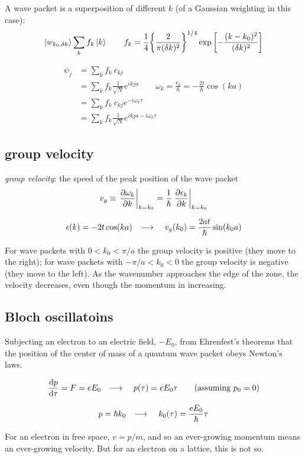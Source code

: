 \documentclass[10pt, a4paper, twocolumn]{article}
\newcommand{\deff}[1]{\par \noindent \textit{#1}: }
\newcommand{\arr}{\ensuremath{\longrightarrow\ }}
\begin{document}
A wave packet is a superposition of different $k$ (of a Gaussian weighting in this case):
\[ \ket{w_{k_0,\delta k}} \sum _k f_k \ket k
\qquad
f_k = \frac14
\qty{\frac{2}{\pi(\delta k)^2}}^{1/4}
\exp \left[ -\frac{(k-k_0)^2}{(\delta k)^2} \right] \]

\begin{equation*}
\begin{aligned}
\psi _j&= \sum _k f_k\ c_{kj}
\\&= \sum_k f_k \frac{1}{\sqrt N} e^{ikja}
\qquad \omega _k = \frac{\epsilon _k}{\hbar}
=-\frac{2t}{\hbar} \cos (ka)
\\&= \sum _k f_k \ c_{kj} e^{-i\omega _k \tau}
\\&= \sum _k f_k \frac{1}{\sqrt N} e^{ikja-i\omega _k \tau}
\end{aligned}
\end{equation*}

\subsection{group velocity}
\deff{group velocity}
the speed of the peak position of the wave packet
\[v_g \equiv \eval{\pdv{\omega _k}{k}}_{k=k_0}
= \frac{1}{\hbar} \eval{\pdv{\epsilon _k}{k}}_{k=k_0} \]

\[ \epsilon (k) = -2t\cos (ka)
\qq{\arr} v_g (k_0) = \frac{2at}{\hbar} \sin (k_0a) \]

For wave packets with $0<k_0<\pi/a$ the group velocity is positive (they move to the right); for wave packets with $-\pi /a<k_0<0$ the group velocity is negative (they move to the left). As the wavenumber approaches the edge of the zone, the velocity decreases, even though the momentum in increasing.

\subsection{Bloch oscillatoins}

Subjecting an electron to an electric field, $-E_0$, from Ehrenfest's theorems that the position of the center of mass of a quantum wave packet obeys Newton's laws.

\[ \dv{p}{\tau} = F = eE_0 \qq{\arr} p(\tau) = eE_0\tau
\qquad (\text{assuming } p_0=0) \]

\[p=\hbar k_0 \qq{\arr}
k_0(\tau) = \frac{eE_0}{\hbar}\tau\]

For an electron in free space, $v=p/m$, and so an ever-growing momentum means an ever-growing velocity. But for an electron on a lattice, this is not so.
\end{document}

